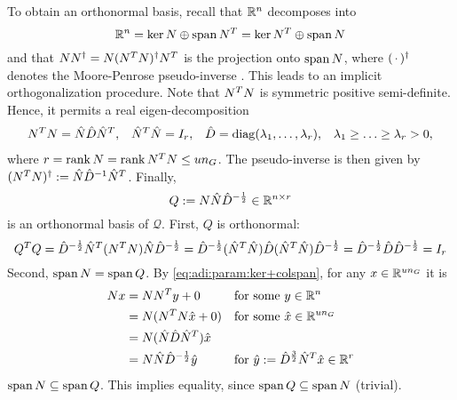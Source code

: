 To obtain an orthonormal basis,
recall that $\mathbb{R}^n$ decomposes into
\begin{equation}
\label{eq:adi:param:ker+colspan}
  \mathbb{R}^n
  = \ker N \oplus \operatorname{span} N^T
  = \ker N^T \oplus \operatorname{span} N
\end{equation}
and that $NN^\dagger = N (N^T N)^\dagger N^T$ is the projection onto $\operatorname{span} N$,
where $(\optional{})^\MP$ denotes the Moore-Penrose pseudo-inverse \cite{Strang2016}.
This leads to an implicit orthogonalization procedure.
Note that $N^T N$ is symmetric positive semi-definite.
Hence, it permits a real eigen-decomposition
\begin{align*}
  N^T N &= \hat N \hat D \hat N^T, &
  \hat N^T \hat N &= I_r, &
  \hat D &= \operatorname{diag}(\lambda_1, \ldots, \lambda_r), &
  \lambda_1 \geq \ldots \geq \lambda_r > 0,
\end{align*}
where $r = \operatorname{rank} N = \operatorname{rank} N^T N \leq u n_G$.
The pseudo-inverse is then given by $ (N^T N)^\dagger := \hat N \hat D^{-1} \hat N^T $.
Finally,
\begin{equation}
\label{eq:adi:param:Q}
  Q := N \hat N \hat D^{-\frac{1}{2}}
  \in\mathbb{R}^{n\times r}
\end{equation}
is an orthonormal basis of $\mathcal Q$.
First, $Q$ is orthonormal:
\begin{equation*}
  Q^T Q
  = \hat D^{-\frac{1}{2}} \hat N^T (N^T N) \hat N \hat D^{-\frac{1}{2}}
  = \hat D^{-\frac{1}{2}} (\hat N^T \hat N) \hat D (\hat N^T \hat N) \hat D^{-\frac{1}{2}}
  = \hat D^{-\frac{1}{2}} \hat D \hat D^{-\frac{1}{2}}
  = I_r
\end{equation*}
Second, $\operatorname{span} N = \operatorname{span} Q$.
By \eqref{eq:adi:param:ker+colspan},
for any $x\in\mathbb{R}^{un_G}$ it is
\begin{align*}
  Nx
  &= NN^T y + 0 &&\text{for some $y\in\mathbb{R}^n$} \\
  &= N(N^T N \hat x + 0) && \text{for some $\hat x \in\mathbb{R}^{un_G}$} \\
  &= N (\hat N \hat D \hat N^T) \hat x \\
  &= N \hat N \hat D^{-\frac{1}{2}} \hat y && \text{for $\hat y := \hat D^{\frac{3}{2}} \hat N^T \hat x \in \mathbb{R}^r$}
\end{align*}
\ie $\operatorname{span} N \subseteq \operatorname{span} Q$.
This implies equality,
since $\operatorname{span} Q \subseteq \operatorname{span} N$ (trivial).

